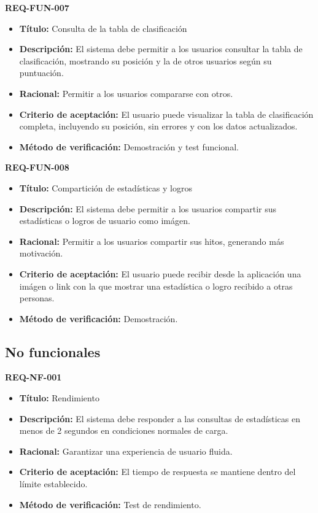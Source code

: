 \textbf{REQ-FUN-007}
\begin{itemize}
    \item \textbf{Título:} Consulta de la tabla de clasificación
    \item \textbf{Descripción:} El sistema debe permitir a los usuarios consultar la tabla de clasificación, mostrando su posición y la de otros usuarios según su puntuación.
    \item \textbf{Racional:} Permitir a los usuarios compararse con otros.
    \item \textbf{Criterio de aceptación:} El usuario puede visualizar la tabla de clasificación completa, incluyendo su posición, sin errores y con los datos actualizados.
    \item \textbf{Método de verificación:} Demostración y test funcional.
\end{itemize}

\textbf{REQ-FUN-008}
\begin{itemize}
    \item \textbf{Título:} Compartición de estadísticas y logros
    \item \textbf{Descripción:} El sistema debe permitir a los usuarios compartir sus estadísticas o logros de usuario como imágen.
    \item \textbf{Racional:} Permitir a los usuarios compartir sus hitos, generando más motivación.
    \item \textbf{Criterio de aceptación:} El usuario puede recibir desde la aplicación una imágen o link con la que mostrar una estadística o logro recibido a otras personas.
    \item \textbf{Método de verificación:} Demostración.
\end{itemize}

\subsection{No funcionales}

\textbf{REQ-NF-001}
\begin{itemize}
    \item \textbf{Título:} Rendimiento
    \item \textbf{Descripción:} El sistema debe responder a las consultas de estadísticas en menos de 2 segundos en condiciones normales de carga.
    \item \textbf{Racional:} Garantizar una experiencia de usuario fluida.
    \item \textbf{Criterio de aceptación:} El tiempo de respuesta se mantiene dentro del límite establecido.
    \item \textbf{Método de verificación:} Test de rendimiento.
\end{itemize}

